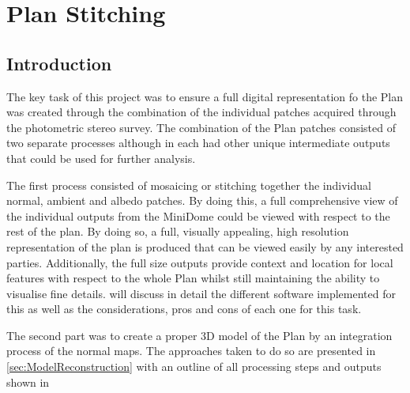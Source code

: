 
\chapter{Plan Stitching}
\label{chp:MosaicStitchingChapter}

\section{Introduction}
\label{sec:Introduction}
The key task of this project was to ensure a full digital representation fo the Plan was created through the combination of the individual patches acquired through the photometric stereo survey. The combination of the Plan patches consisted of two separate processes although in each had other unique intermediate outputs that could be used for further analysis.

The first process consisted of mosaicing or stitching together the individual normal, ambient and albedo patches. By doing this, a full comprehensive view of the individual outputs from the MiniDome could be viewed with respect to the rest of the plan. By doing so, a full, visually appealing, high resolution representation of the plan is produced that can be viewed easily by any interested parties. Additionally, the full size outputs provide context and location for local features with respect to the whole Plan whilst still maintaining the ability to visualise fine details.  will discuss in detail the different software implemented for this as well as the considerations, pros and cons of each one for this task.

The second part was to create a proper 3D model of the Plan by an integration process of the normal maps. The approaches taken to do so are presented in \cref{sec:ModelReconstruction} with an outline of all processing steps and outputs shown in 


